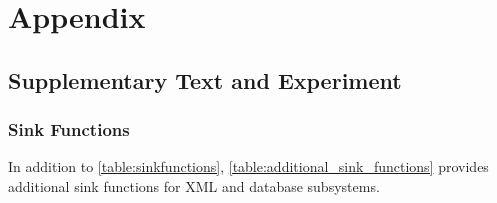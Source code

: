\section{Appendix}
\subsection{Supplementary Text and Experiment}
\subsubsection{Sink Functions}
\label{appendix:sinkfunctions}
In addition to \autoref{table:sinkfunctions}, \autoref{table:additional_sink_functions} provides additional sink functions for XML and database subsystems.








% 

